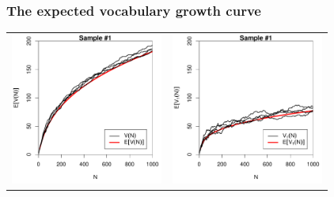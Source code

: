 \documentclass[t]{beamer} %
\begin{document}
\begin{frame}
  \frametitle{The expected vocabulary growth curve}

  \ungap[1]
  \begin{center}
    \begin{tabular}{c @{} c}
      \includegraphics[width=50mm]{img/05-samples-vgc-exp-vs-samples} &
      \includegraphics[width=50mm]{img/05-samples-vgc-V1-exp-vs-samples}
    \end{tabular}
  \end{center}
\end{frame}
\end{document}
